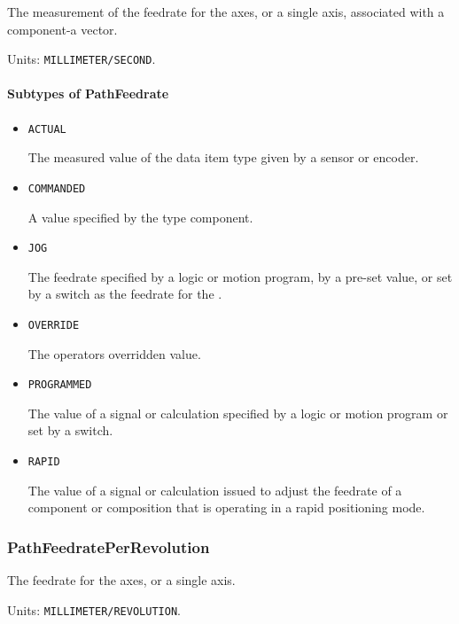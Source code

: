 The measurement of the feedrate for the axes, or a single axis, associated with a  component-a vector.


Units: \texttt{MILLIMETER/SECOND}.

\paragraph{Subtypes of PathFeedrate}\mbox{}
\label{sec:Subtypes of PathFeedrate}

\begin{itemize}

\item \texttt{ACTUAL}


The measured value of the data item type given by a sensor or encoder.

\item \texttt{COMMANDED}


A value specified by the  type component.

\item \texttt{JOG}


The feedrate specified by a logic or motion program, by a pre-set value, or set by a switch as the feedrate for the . 

\item \texttt{OVERRIDE}


The operators overridden value.

\item \texttt{PROGRAMMED}


The value of a signal or calculation specified by a logic or motion program or set by a switch.

\item \texttt{RAPID}


The value of a signal or calculation issued to adjust the feedrate of a component or composition that is operating in a rapid positioning mode.


\end{itemize}

\subsubsection{PathFeedratePerRevolution}
\label{sec:PathFeedratePerRevolution}



The feedrate for the axes, or a single axis.


Units: \texttt{MILLIMETER/REVOLUTION}.

